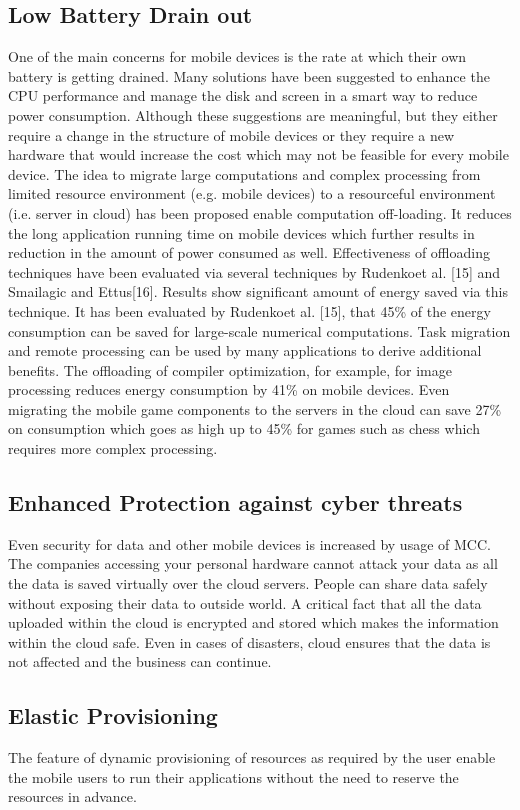 \documentclass[10pt, conference, compsocconf]{IEEEtran}
\begin{document}
\subsection{Low Battery Drain out}
One of the main concerns for mobile devices is the rate at which their own battery is getting drained. Many solutions have been suggested to enhance the CPU performance and manage the disk and screen in a smart way to reduce power consumption. Although these suggestions are meaningful, but they either require a change in the structure of mobile devices or they require a new hardware that would increase the cost which may not be feasible for every mobile device. The idea to migrate large computations and complex processing from limited resource environment (e.g. mobile devices) to a resourceful environment (i.e. server in cloud) has been proposed enable computation off-loading. It reduces the long application running time on mobile devices which further results in reduction in the amount of power consumed as well. Effectiveness of offloading techniques have been evaluated via several techniques by Rudenkoet al. [15] and Smailagic and Ettus[16]. Results show significant amount of energy saved via this technique. It has been evaluated by Rudenkoet al. [15], that 45\% of the energy consumption can be saved for large-scale numerical computations. Task migration and remote processing can be used by many applications to derive additional benefits. The offloading of compiler optimization, for example, for image processing reduces energy consumption by 41\% on mobile devices. Even migrating the mobile game components to the servers in the cloud can save 27\% on consumption which goes as high up to 45\% for games such as chess which requires more complex processing.

\subsection{Enhanced Protection against cyber threats}
Even security for data and other mobile devices is increased by usage of MCC. The companies accessing your personal hardware cannot attack your data as all the data is saved virtually over the cloud servers. People can share data safely without exposing their data to outside world. A critical fact that all the data uploaded within the cloud is encrypted and stored which makes the information within the cloud safe. Even in cases of disasters, cloud ensures that the data is not affected and the business can continue.

\subsection{Elastic Provisioning}
The feature of dynamic provisioning of resources as required by the user enable the mobile users to run their applications without the need to reserve the resources in advance.
\end{document}
